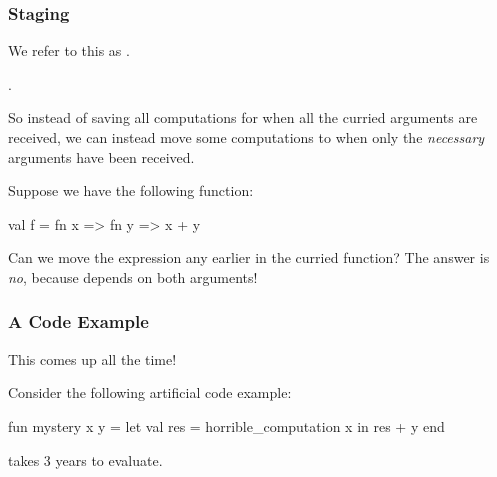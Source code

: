 \documentclass[aspectratio=169]{beamer}
\begin{document}
\begin{frame}[fragile]
  \frametitle{Staging}

  We refer to this as .

  \pause
  \vspace{\fill}

  .

  \pause
  \vspace{\fill}

  So instead of saving all computations for when all the curried arguments are received,
  we can instead move some computations to when only the \textit{necessary} arguments
  have been received.

  \pause
  \vspace{\fill}

  Suppose we have the following function:
  \begin{codeblock}
    val f = fn x => fn y => x + y
  \end{codeblock}

  \pause
  \vspace{\fill}

  Can we move the expression  any earlier in the curried function? The
  answer is \textit{no}, because  depends on both arguments!
\end{frame}

\begin{frame}[fragile]
  \frametitle{A Code Example}

  This comes up all the time!

  \pause
  \vspace{\fill}

  Consider the following artificial code example:

  \begin{codeblock}
    fun mystery x y =
      let
        val res = horrible_computation x
      in
        res + y
      end
  \end{codeblock}

  \pause
  \vspace{\fill}

   takes 3 years to evaluate.
\end{frame}
\end{document}

